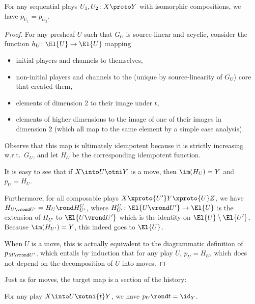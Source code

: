 \documentclass{LMCS}
\theoremstyle{plain}\newtheorem{satz}[thm]{Satz}
\begin{document}
\begin{prop}
  For any sequential plays $U_1, U_2 \colon X \proto Y$ with isomorphic
  compositions, we have $p_{U_1} = p_{U_2}$.
\end{prop}
\begin{proof}
  For any presheaf $U$ such that $G_U$ is source-linear and acyclic,
  consider the function $h_U \colon \El{U} \to \El{U}$ mapping
  \begin{itemize}
  \item initial players and channels to themselves,
  \item non-initial players and channels to the (unique by
    source-linearity of $G_U$) core that created them,
  \item elements of dimension 2 to their image under $t$,
  \item elements of higher dimensions to the image of one of their
    images in dimension 2 (which all map to the same element by a
    simple case analysis).
  \end{itemize}
  Observe that this map is ultimately idempotent because it is
  strictly increasing w.r.t.\ $G_U$, and let $H_U$ be the
  corresponding idempotent function.

  It is easy to see that if $X \into U \otni Y$ is a move,
  then $\im (H_U) = Y$ and $p_U = H_U$.

  Furthermore, for all composable plays $X \xproto{U'} Y \xproto{U} Z$, we
  have $H_{U \vrond U'} = H_U \rond H^U_{U'}$, where $H^U_{U'} \colon
  \El{U \vrond U'} \to \El{U}$ is the extension of $H_{U'}$ to $\El{U
    \vrond U'}$ which is the identity on $\El{U} \setminus
  \El{U'}$. Because $\im (H_{U'}) = Y$, this indeed goes to $\El{U}$.

  When $U$ is a move, this is actually equivalent to the
  diagrammatic definition of $p_{M \vrond U'}$, which entails by
  induction that for any play $U$, $p_U = H_U$, which does not depend
  on the decomposition of $U$ into moves.
\end{proof}

Just as for moves, the target map is a section of the history:
\begin{prop}
  For any play $X \into U \xotni{t} Y$, we have $p_U \rond t = \id_Y$.
\end{prop}
\end{document}
